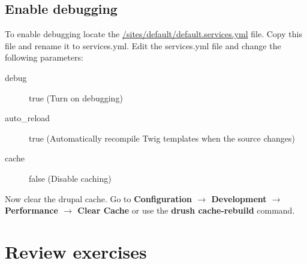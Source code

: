 \subsection{Enable debugging}

To enable debugging locate the \url{/sites/default/default.services.yml} file. Copy this file and rename it to services.yml. Edit the services.yml file and change the following parameters:


\begin{description}
	\item[debug] true (Turn on debugging)
	\item[auto\_reload] true (Automatically recompile Twig templates when the source changes)
	\item[cache] false (Disable caching)
\end{description}

Now clear the drupal cache. Go to \textbf{Configuration $\rightarrow$ Development $\rightarrow$ Performance $\rightarrow$ Clear Cache} or use the \textbf{drush cache-rebuild} command.

\section{Review exercises}

